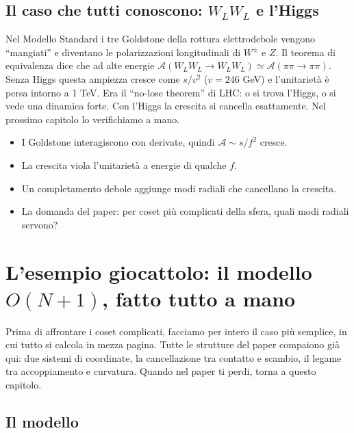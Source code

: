 \documentclass[11pt,a4paper]{article}
\numberwithin{equation}{section}
\theoremstyle{remark}
\begin{document}
\subsection{Il caso che tutti conoscono: $W_LW_L$ e l'Higgs}

Nel Modello Standard i tre Goldstone della rottura elettrodebole vengono ``mangiati'' e diventano le polarizzazioni longitudinali di $W^\pm$ e $Z$. Il teorema di equivalenza dice che ad alte energie $\mathcal A(W_LW_L\to W_LW_L)\simeq\mathcal A(\pi\pi\to\pi\pi)$. Senza Higgs questa ampiezza cresce come $s/v^2$ ($v=246$ GeV) e l'unitarietà è persa intorno a 1 TeV. Era il ``no-lose theorem'' di LHC: o si trova l'Higgs, o si vede una dinamica forte. Con l'Higgs la crescita si cancella esattamente. Nel prossimo capitolo lo verifichiamo a mano.

\begin{porta}
\begin{itemize}[nosep]
\item I Goldstone interagiscono con derivate, quindi $\mathcal A\sim s/f^2$ cresce.
\item La crescita viola l'unitarietà a energie di qualche $f$.
\item Un completamento debole aggiunge modi radiali che cancellano la crescita.
\item La domanda del paper: per coset più complicati della sfera, quali modi radiali servono?
\end{itemize}
\end{porta}

\section{L'esempio giocattolo: il modello $O(N+1)$, fatto tutto a mano}
\label{cap:toy}

\begin{dove}
Prima di affrontare i coset complicati, facciamo per intero il caso più semplice, in cui tutto si calcola in mezza pagina. Tutte le strutture del paper compaiono già qui: due sistemi di coordinate, la cancellazione tra contatto e scambio, il legame tra accoppiamento e curvatura. Quando nel paper ti perdi, torna a questo capitolo.
\end{dove}

\subsection{Il modello}
\end{document}
